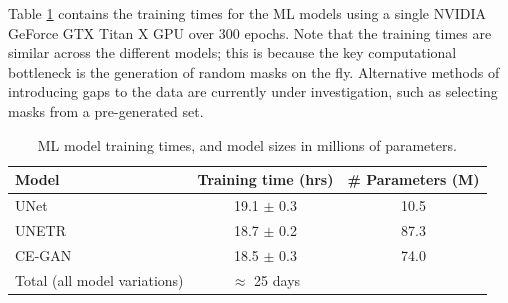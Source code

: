 \documentclass{article}
\begin{document}

Table \ref{tab:times} contains the training times for the ML models using a single NVIDIA GeForce GTX Titan X GPU over 300 epochs. Note that the training times are similar across the different models; this is because the key computational bottleneck is the generation of random masks on the fly. Alternative methods of introducing gaps to the data are currently under investigation, such as selecting masks from a pre-generated set.

\begin{table}[h]
  \caption{ML model training times, and model sizes in millions of parameters.}
  \label{tab:times}
  \centering
  \footnotesize
  \begin{tabular}{lcc}
    \toprule
    Model     & Training time (hrs)     &  \# Parameters (M) \\
    \midrule
    UNet & 19.1 $\pm$ 0.3 & 10.5 \\
    UNETR & 18.7 $\pm$ 0.2  & 87.3 \\
    CE-GAN & 18.5 $\pm$ 0.3 & 74.0 \\
    \midrule 
    Total (all model variations) & $\approx$ 25 days & \\
    \bottomrule
  \end{tabular}
\end{table}
\end{document}
